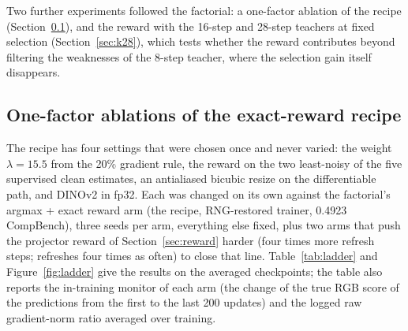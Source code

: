 \documentclass[11pt,a4paper]{article}
\begin{document}
Two further experiments followed the factorial: a one-factor ablation of the recipe (Section~\ref{sec:ladder}), and the reward with the 16-step and 28-step teachers at fixed selection (Section~\ref{sec:k28}), which tests whether the reward contributes beyond filtering the weaknesses of the 8-step teacher, where the selection gain itself disappears.

\subsection{One-factor ablations of the exact-reward recipe}
\label{sec:ladder}
The recipe has four settings that were chosen once and never varied: the weight $\lambda=15.5$ from the 20\% gradient rule, the reward on the two least-noisy of the five supervised clean estimates, an antialiased bicubic resize on the differentiable path, and DINOv2 in fp32. Each was changed on its own against the factorial's argmax + exact reward arm (the recipe, RNG-restored trainer, 0.4923 CompBench), three seeds per arm, everything else fixed, plus two arms that push the projector reward of Section~\ref{sec:reward} harder (four times more refresh steps; refreshes four times as often) to close that line. Table~\ref{tab:ladder} and Figure~\ref{fig:ladder} give the results on the averaged checkpoints; the table also reports the in-training monitor of each arm (the change of the true RGB score of the predictions from the first to the last 200 updates) and the logged raw gradient-norm ratio averaged over training.
\end{document}
